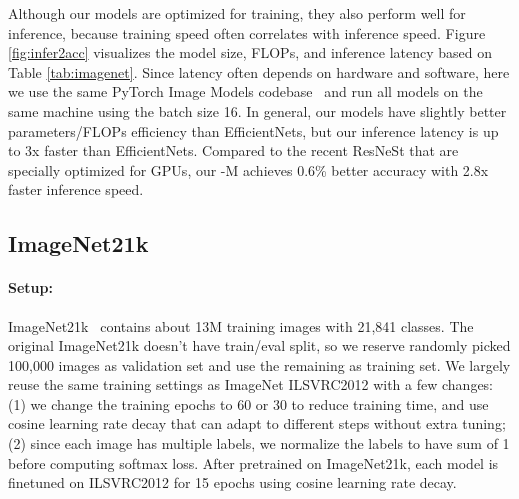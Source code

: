 \documentclass{article}
\begin{document}
Although our {\xnet} models are optimized for training, they also perform well for inference, because training speed  often correlates with inference speed.  Figure \ref{fig:infer2acc} visualizes the model size, FLOPs, and inference latency based on Table \ref{tab:imagenet}. Since latency often depends on hardware and software, here we use the same PyTorch Image Models codebase~\cite{pytorchimagemodel} and run all models on the same machine using the batch size 16. In general, our models have slightly better parameters/FLOPs efficiency than EfficientNets, but our inference latency is up to 3x faster than EfficientNets. Compared to the recent ResNeSt that are specially optimized for GPUs, our {\xnet}-M achieves 0.6\% better accuracy with 2.8x faster inference speed.





\subsection{ImageNet21k}
\paragraph{Setup:} ImageNet21k~\cite{imagenet15} contains about 13M training images with 21,841 classes. The original ImageNet21k doesn't have train/eval split, so we reserve randomly picked 100,000 images as validation set and use the remaining as training set. We largely reuse the same training settings as ImageNet ILSVRC2012 with a few changes: (1) we change the training epochs to 60 or 30 to reduce training time, and use cosine learning rate decay that can adapt to different steps without extra tuning; (2) since each image has multiple labels, we normalize the labels to have sum of 1 before computing softmax loss. After pretrained on ImageNet21k, each model is finetuned on ILSVRC2012 for 15 epochs using cosine learning rate decay.
\end{document}

